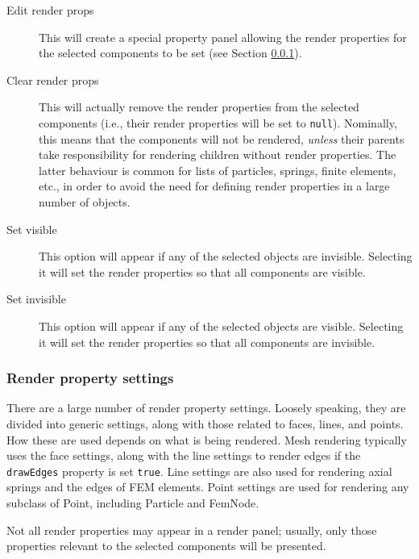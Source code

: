 \documentclass{article}
\begin{document}
\begin{description}

\item[Edit render props]\mbox{}

This will create a special property panel allowing the render properties for
the selected components to be set (see Section \ref{renderPropSettingsSec}).

\item[Clear render props]\mbox{}

This will actually remove the render properties
from the selected components (i.e., their render properties will be
set to {\tt null}).  Nominally, this means that the components will not be
rendered, {\it unless} their parents take responsibility for rendering
children without render properties. The latter behaviour is common for
lists of particles, springs, finite elements, etc., in order to
avoid the need for defining render properties in a large number
of objects.

\item[Set visible]\mbox{}

This option will appear if any of the selected objects are
invisible. Selecting it will set the render properties so
that all components are visible.

\item[Set invisible]\mbox{}

This option will appear if any of the selected objects are
visible. Selecting it will set the render properties so
that all components are invisible.

\end{description}

\subsubsection{Render property settings}
\label{renderPropSettingsSec}

There are a large number of render property settings. Loosely
speaking, they are divided into generic settings, along with those
related to faces, lines, and points. How these are used depends on
what is being rendered. Mesh rendering typically uses the face
settings, along with the line settings to render edges if the
{\tt drawEdges} property is set {\tt true}.  Line settings are also used for
rendering axial springs and the edges of FEM elements.  Point settings
are used for rendering any subclass of Point, including Particle and
FemNode. 

Not all render properties may appear in a render panel; usually, only
those properties relevant to the selected components will be
presented.
\end{document}
